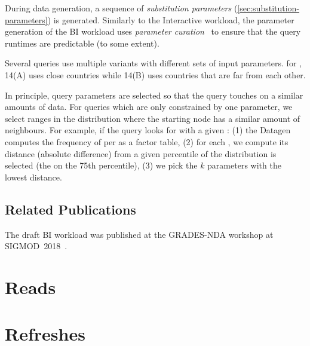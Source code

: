 During data generation, a sequence of \emph{substitution parameters} (\autoref{sec:substitution-parameters}) is generated.
Similarly to the Interactive workload, the parameter generation of the BI workload uses \emph{parameter curation}~\cite{DBLP:conf/tpctc/GubichevB14} to ensure that the query runtimes are  predictable (to some extent).

Several queries use multiple variants with different sets of input parameters.
\Eg for , 14(A) uses close countries while 14(B) uses countries that are far from each other.

In principle, query parameters are selected so that the query touches on a similar amounts of data.
For queries which are only constrained by one parameter, we select ranges in the distribution where the starting node has a similar amount of neighbours.
For example, if the query looks for \tMessages with a given \tTag:
(1) the Datagen computes the frequency of \tMessages per \tTags as a factor table,
(2) for each \tTag, we compute its distance (absolute difference) from a given percentile of the distribution is selected (\eg the \tTag on the 75th percentile),
(3) we pick the $k$ parameters with the lowest distance.

\subsection*{Related Publications}

The draft BI workload was published at the \mbox{GRADES-NDA} workshop at \mbox{SIGMOD 2018}~\cite{DBLP:conf/grades/SzarnyasPAMPKEB18}.


\section{Reads}
\label{sec:bi-reads}




\section{Refreshes}
\label{sec:bi-refreshes}

